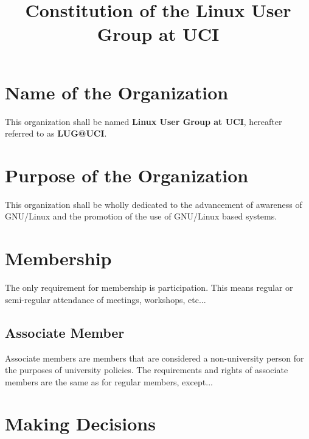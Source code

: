 \documentclass{article}
\title{Constitution of the Linux User Group at UCI}
\begin{document}
\maketitle

\section{Name of the Organization}

This organization shall be named \textbf{Linux User Group at UCI}, hereafter 
referred to as \textbf{LUG@UCI}.

\section{Purpose of the Organization}

This organization shall be wholly dedicated to the advancement of awareness of 
GNU/Linux and the promotion of the use of GNU/Linux based systems.

\section{Membership}

The only requirement for membership is participation.  This means regular or 
semi-regular attendance of meetings, workshops, etc...




\subsection{Associate Member}

Associate members are members that are considered a non-university person for 
the purposes of university policies.  The requirements and rights of associate 
members are the same as for regular members, except...


\section{Making Decisions}

\end{document}
